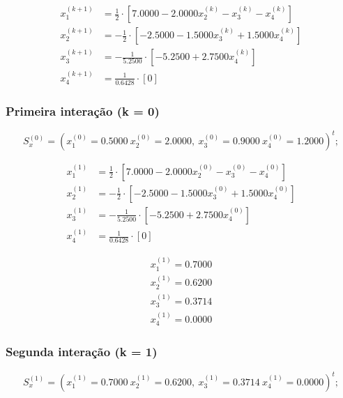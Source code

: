 \documentclass[12pt]{article}
\begin{document}
                \begin{align*}
                    x_1^{(k+1)} &= \frac{1}{2} \cdot [7.0000 - 2.0000x_2^{(k)} - x_3^{(k)} - x_4^{(k)}]\\
                    x_2^{(k+1)} &= -\frac{1}{2} \cdot [-2.5000 - 1.5000x_3^{(k)} + 1.5000x_4^{(k)}]\\
                    x_3^{(k+1)} &= -\frac{1}{5.2500} \cdot [-5.2500 + 2.7500x_4^{(k)}]\\
                    x_4^{(k+1)} &= \frac{1}{0.6428} \cdot [0]
                \end{align*}

            \subsubsection{Primeira interação (k = 0)}

                \[
                S_x^{(0)} = (x_1^{(0)} = 0.5000\ x_2^{(0)}= 2.0000,\ x_3^{(0)}= 0.9000\ x_4^{(0)}= 1.2000)^t;
                \]

                \begin{align*}
                    x_1^{(1)} &= \frac{1}{2} \cdot [7.0000 - 2.0000x_2^{(0)} - x_3^{(0)} - x_4^{(0)}]\\
                    x_2^{(1)} &= -\frac{1}{2} \cdot [-2.5000 - 1.5000x_3^{(0)} + 1.5000x_4^{(0)}]\\
                    x_3^{(1)} &= -\frac{1}{5.2500} \cdot [-5.2500 + 2.7500x_4^{(0)}]\\
                    x_4^{(1)} &= \frac{1}{0.6428} \cdot [0]
                \end{align*}

                \begin{align*}
                    x_1^{(1)} = 0.7000\\ x_2^{(1)}= 0.6200\\ x_3^{(1)}= 0.3714\\ x_4^{(1)}= 0.0000
                \end{align*}
            \newpage

            \subsubsection{Segunda interação (k = 1)}

                \[
                S_x^{(1)} = (x_1^{(1)} = 0.7000\ x_2^{(1)}= 0.6200,\ x_3^{(1)}= 0.3714\ x_4^{(1)}= 0.0000)^t;
                \]
\end{document}
